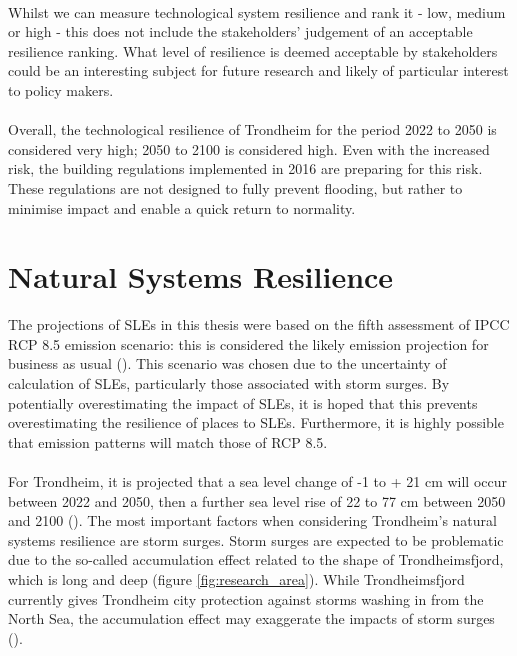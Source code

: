 \paragraph{}
Whilst we can measure technological system resilience and rank it - low, medium or high - this does not include the stakeholders' judgement of an acceptable resilience ranking. What level of resilience is deemed acceptable by stakeholders could be an interesting subject for future research and likely of particular interest to policy makers.
\paragraph{}
Overall, the technological resilience of Trondheim for the period 2022 to 2050 is considered very high; 2050 to 2100 is considered high. Even with the increased risk, the building regulations implemented in 2016 are preparing for this risk. These regulations are not designed to fully prevent flooding, but rather to minimise impact and enable a quick return to normality. 


\section{Natural Systems Resilience}
The projections of SLEs in this thesis were based on the fifth assessment of IPCC RCP 8.5 emission scenario: this is considered the likely emission projection for business as usual (\cite{hanssen-bauer_climate_2017}). This scenario was chosen due to the uncertainty of calculation of SLEs, particularly those associated with storm surges. By potentially overestimating the impact of SLEs, it is hoped that this prevents overestimating the resilience of places to SLEs. Furthermore, it is highly possible that emission patterns will match those of RCP 8.5. 
\paragraph{}

For Trondheim, it is projected that a sea level change of -1 to + 21 cm will occur between 2022 and 2050, then a further sea level rise of 22 to 77 cm between 2050 and 2100 (\cite{hanssen_saksframlegg_2013}). The most important factors when considering Trondheim's natural systems resilience are storm surges. Storm surges are expected to be problematic due to the so-called accumulation effect related to the shape of Trondheimsfjord, which is long and deep  (figure \ref{fig:research_area}). While Trondheimsfjord currently gives Trondheim city protection against storms washing in from the North Sea, the accumulation effect may exaggerate the impacts of storm surges (\cite{hanssen_saksframlegg_2013}). 
